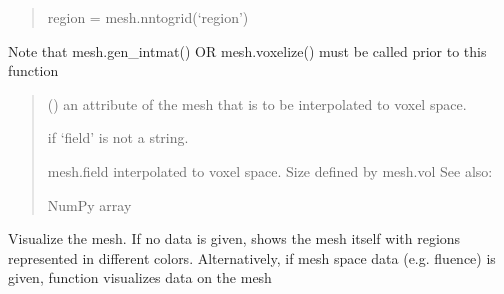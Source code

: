 \documentclass[letterpaper,10pt,english]{sphinxmanual}
\begin{document}
\begin{fulllineitems}
\begin{fulllineitems}
\begin{quote}
\sphinxAtStartPar
region = mesh.nntogrid(‘region’)
\end{quote}

\sphinxAtStartPar
Note that mesh.gen\_intmat() OR mesh.voxelize() must be called prior to this function
\begin{quote}\begin{description}
\sphinxAtStartPar
{} () \textendash{} an attribute of the mesh that is to be interpolated to voxel space.

\sphinxAtStartPar
{} \textendash{} if ‘field’ is not a string.

\sphinxAtStartPar
{} \textendash{} mesh.field interpolated to voxel space. Size defined by mesh.vol
See also: {\hyperref[\detokenize{_autosummary/nirfasterff.utils.nntogrid:nirfasterff.utils.nntogrid}]{}}

\sphinxAtStartPar
NumPy array

\end{description}\end{quote}

\end{fulllineitems}


\begin{fulllineitems}
\label{\detokenize{_autosummary/nirfasterff.base.dcs_mesh.dcsmesh:nirfasterff.base.dcs_mesh.dcsmesh.plot}}
\pysigstartsignatures
\pysiglinewithargsret
{}
{\sphinxparamcomma {}\sphinxparamcomma {}\sphinxparamcomma {}\sphinxparamcomma {}}
{}
\pysigstopsignatures
\sphinxAtStartPar
Visualize the mesh. If no data is given, shows the mesh itself with regions represented in different colors.
Alternatively, if mesh space data (e.g. fluence) is given, function visualizes data on the mesh


\end{fulllineitems}
\end{fulllineitems}
\end{document}
